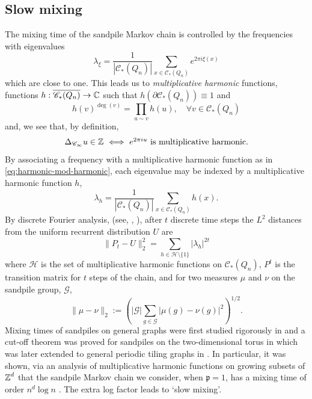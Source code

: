\documentclass[12pt]{amsart}
\numberwithin{equation}{section}
\begin{document}
	\subsection{Slow mixing} \label{subsec:slow-mixing-sandpile}
	The mixing time of the sandpile Markov chain is controlled by the frequencies with eigenvalues
	\begin{equation} \label{eq:eigenvalue-frequency}
		\lambda_{\xi} = \frac{1}{|\mathscr{C}_{*}(Q_n)|} \sum_{x \in \mathscr{C}_{*}(Q_n)} e^{2 \pi i \xi(x)} 
	\end{equation}
	which are close to one. This leads us to {\it multiplicative harmonic} functions, functions  $h: \overline{\mathscr{C}_{*}(Q_n)} \to \operatorname{\mathbb{C}}$ such that $h(\partial \mathscr{C}_{*}(Q_n)) \equiv 1$ and 
	\[
	h(v)^{\deg(v)} = \prod_{u \sim v} h(u), \quad \forall v \in \mathscr{C}_{*}(Q_n)
	\]
	and, we see that, by definition, 
	\begin{equation} \label{eq:harmonic-mod-harmonic}
		\mbox{$\Delta_{\mathscr{C}_{\infty}} u \in \operatorname{\mathbb{Z}}$ $\iff$ $e^{2 \pi i u}$ is multiplicative harmonic}.
	\end{equation} 
	By associating a frequency with a multiplicative harmonic function as in \eqref{eq:harmonic-mod-harmonic}, 
	each eigenvalue may be indexed by a multiplicative harmonic function $h$,
	\[
	\lambda_{h} = \frac{1}{|\mathscr{C}_{*}(Q_n)|} \sum_{x \in \mathscr{C}_{*}(Q_n)}  h(x).
	\]
	By discrete Fourier analysis, (see, \eg, \cite[Lemma 2.9]{jerison-levine-pike-2019}), after $t$ discrete time steps the $L^2$ distances from the uniform recurrent distribution $U$ are 
	\begin{equation} \label{eq:multiplicative-harmonic-eigenvalue-diff}
		\| P_t - U\|^2_2 = \sum_{h \in \mathcal{H} \setminus \{1\}} | \lambda_h|^{2 t}
	\end{equation}
	where $\mathcal{H}$ is the set of multiplicative harmonic functions on $\mathscr{C}_*(Q_n)$,  $P^t$ is the transition matrix for $t$ steps of the chain, and for two measures $\mu$ and $\nu$ on the sandpile group, $\mathcal{G}$,
	\[
	\| \mu - \nu \|_2 := \left( |\mathcal{G}| \sum_{g \in \mathcal{G}} |\mu(g) - \nu(g)|^2 \right)^{1/2}.
	\]
	Mixing times of sandpiles on general graphs were first studied rigorously in \cite{jerison-levine-pike-2019}
	and a cut-off theorem was proved for sandpiles on the two-dimensional torus in \cite{sandpiles-square-lattice}
	which was later extended to general periodic tiling graphs in \cite{hough-cutoff, hough-spectrum}.  
	In particular, it was shown, via an analysis of multiplicative harmonic functions on growing subsets of $\operatorname{\mathbb{Z}}^d$  that the sandpile Markov chain we consider, when $\mathfrak{p} = 1$, has a mixing time of order $n^d \log n$ \cite{hough-cutoff, hough-spectrum}. The extra log factor 
	leads to `slow mixing'. 
	
\end{document}
